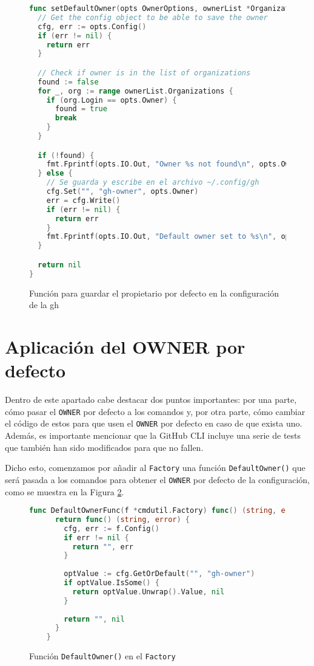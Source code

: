 \begin{figure}[H]
  \begin{lstlisting}[language=GO]
func setDefaultOwner(opts OwnerOptions, ownerList *OrganizationList) error {
  // Get the config object to be able to save the owner
  cfg, err := opts.Config()
  if (err != nil) {
    return err
  }

  // Check if owner is in the list of organizations
  found := false
  for _, org := range ownerList.Organizations {
    if (org.Login == opts.Owner) {
      found = true
      break
    }
  }

  if (!found) {
    fmt.Fprintf(opts.IO.Out, "Owner %s not found\n", opts.Owner)
  } else {
    // Se guarda y escribe en el archivo ~/.config/gh
    cfg.Set("", "gh-owner", opts.Owner)
    err = cfg.Write()
    if (err != nil) {
      return err
    }
    fmt.Fprintf(opts.IO.Out, "Default owner set to %s\n", opts.Owner)
  }

  return nil
}
  \end{lstlisting}
  \caption{Función para guardar el propietario por defecto en la configuración de la gh}
  \label{fig:saveOwner}
\end{figure}

\section{Aplicación del OWNER por defecto}

Dentro de este apartado cabe destacar dos puntos importantes: por una parte, cómo pasar el \texttt{OWNER} por defecto a los comandos y, por otra parte, cómo cambiar el código de estos para que usen el \texttt{OWNER} por defecto en caso de que exista uno. Además, es importante mencionar que la GitHub CLI incluye una serie de tests que también han sido modificados para que no fallen.

Dicho esto, comenzamos por añadir al \texttt{Factory} una función \texttt{DefaultOwner()} que será pasada a los comandos para obtener el \texttt{OWNER} por defecto de la configuración, como se muestra en la Figura \ref{fig:defaultOwner}.

\begin{figure}[H]
  \begin{lstlisting}[language=GO]
    func DefaultOwnerFunc(f *cmdutil.Factory) func() (string, error) {
      return func() (string, error) {
        cfg, err := f.Config()
        if err != nil {
          return "", err
        }
    
        optValue := cfg.GetOrDefault("", "gh-owner")
        if optValue.IsSome() {
          return optValue.Unwrap().Value, nil
        }
    
        return "", nil
      }
    }
  \end{lstlisting}
  \caption{Función \texttt{DefaultOwner()} en el \texttt{Factory}}
  \label{fig:defaultOwner}
\end{figure}

